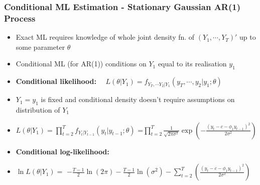 \documentclass{beamer}
\begin{document}
		\begin{frame}
		\frametitle{Conditional ML Estimation - Stationary Gaussian AR(1) Process}
		\begin{itemize}
			
			
			\item[] Exact ML requires knowledge of whole joint density fn. of $(Y_1,\cdots,Y_T)'$ up to some parameter $\theta$
						\pause	\vspace{15pt} 
			\item[] Conditional ML (for AR(1)) conditions on $Y_1$  equal to its realisation $y_1$
				\pause	\vspace{19pt} 
			\item[] \textbf{Conditional likelihood:} $\quad L(\theta|Y_1)=f_{Y_T,\cdots Y_2|Y_1}(y_T,\cdots,y_2|y_1 ; \theta)$
				\pause	\vspace{15pt} 
						\item[] \hspace{25pt} $Y_1=y_1$ is fixed and conditional density doesn't require assumptions on distribution of $Y_1$
				\pause	\vspace{15pt} 
			\item[] \hspace{20pt} $L(\theta|Y_1)= \displaystyle \prod_{t=2}^{T} f_{Y_t|Y_{t-1}}(y_t| y_{t-1}; \theta)$ \pause	=$ \displaystyle \prod_{t=2}^{T} \frac{1}{\sqrt{2\pi\sigma^2}} \exp\left(-\frac{(y_t-c-\phi_1 y_{t-1})^2}{2\sigma^2}\right)$
			\pause	\vspace{20pt} 
			\item[] \textbf{Conditional log-likelihood:}\\
	\item[]\hspace{15pt} $\ln L(\theta|Y_1)=$ $- \frac{T-1}{2}\ln(2\pi) -\frac{T-1}{2}\ln(\sigma^2)-\sum_{t=2}^T \left(\frac{(y_t-c-\phi_1 y_{t-1})^2}{2\sigma^2}\right)$
			
					\end{itemize}
		\end{frame}
			
\end{document}
